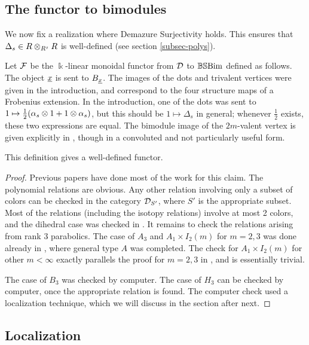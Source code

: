 \subsection{The functor to bimodules} \label{subsec-functor}

We now fix a realization where Demazure Surjectivity holds. This ensures that $\Delta_s \in R \otimes_{R^s} R$ is well-defined (see section \ref{subsec-polys}).

\begin{defn} Let ${\mathcal{F}}$ be the $\Bbbk$-linear monoidal functor from ${\mathcal{D}}$ to $\mathbb{BS}\textrm{Bim}$ defined as follows. The object ${\underline{x}}$ is sent to $B_{{\underline{x}}}$. The images of the dots and trivalent vertices were given in the introduction, and correspond to the four structure maps of a Frobenius extension. In the introduction, one of the dots was sent to $1 \mapsto \frac{1}{2} (\alpha_s \otimes 1 + 1 \otimes \alpha_s)$, but this should be $1 \mapsto \Delta_s$ in general; whenever $\frac{1}{2}$ exists, these two expressions are equal. The bimodule image of the $2m$-valent vertex is given explicitly in \cite{EDihedral}, though in a convoluted and not particularly useful form. \end{defn}

\begin{claim} This definition gives a well-defined functor. \end{claim}

\begin{proof} Previous papers have done most of the work for this claim. The polynomial relations are obvious. Any other relation involving only a subset of colors can be checked in the
category ${\mathcal{D}}_{S'}$, where $S'$ is the appropriate subset. Most of the relations (including the isotopy relations) involve at most 2 colors, and the dihedral case was checked in
\cite{EDihedral}. It remains to check the relations arising from rank 3 parabolics. The case of $A_3$ and $A_1 \times I_2(m)$ for $m=2,3$ was done already in \cite{EKh}, where general type
$A$ was completed. The check for $A_1 \times I_2(m)$ for other $m < \infty$ exactly parallels the proof for $m=2,3$ in \cite{EKh}, and is essentially trivial.

The case of $B_3$ was checked by computer. The case of $H_3$ can be checked by computer, once the appropriate relation is found. The computer check used a localization technique, which we
will discuss in the section after next. \end{proof}

\subsection{Localization}

